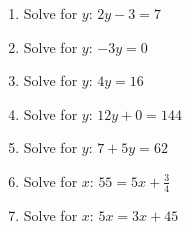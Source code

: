         \label{m39241*id148396}\begin{enumerate}[noitemsep, label=\textbf{\arabic*}. ] 
            \label{m39241*uid11}\item Solve for \begin{math}y\end{math}: \begin{math}2y-3=7\end{math}\hspace{1ex}        
\label{m39241*uid12}\item Solve for \begin{math}y\end{math}: \begin{math}-3y=0\end{math}\hspace{1ex}        
\label{m39241*uid13}\item Solve for \begin{math}y\end{math}: \begin{math}4y=16\end{math}\hspace{1ex}        
\label{m39241*uid14}\item Solve for \begin{math}y\end{math}: \begin{math}12y+0=144\end{math}\hspace{1ex}        
\label{m39241*uid15}\item Solve for \begin{math}y\end{math}: \begin{math}7+5y=62\end{math}\hspace{1ex}        
\label{m39241*uid16}\item Solve for \begin{math}x\end{math}: \begin{math}55=5x+\frac{3}{4}\end{math}\hspace{1ex}        
\label{m39241*uid17}\item Solve for \begin{math}x\end{math}: \begin{math}5x=3x+45\end{math}\hspace{1ex}        

\end{enumerate}
